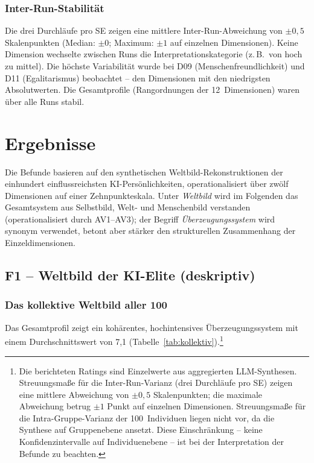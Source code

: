\documentclass[12pt,a4paper]{article}
\begin{document}
\subsubsection{Inter-Run-Stabilit\"at}

Die drei Durchl\"aufe pro SE zeigen eine mittlere Inter-Run-Abweichung von $\pm 0{,}5$ Skalenpunkten (Median: $\pm 0$; Maximum: $\pm 1$ auf einzelnen Dimensionen). Keine Dimension wechselte zwischen Runs die Interpretationskategorie (z.\,B.\ von \glqq hoch\grqq{} zu \glqq mittel\grqq). Die h\"ochste Variabilit\"at wurde bei D09 (Menschenfreundlichkeit) und D11 (Egalitarismus) beobachtet -- den Dimensionen mit den niedrigsten Absolutwerten. Die Gesamtprofile (Rang\-ordnungen der 12~Dimensionen) waren \"uber alle Runs stabil.


\section{Ergebnisse}
\label{sec:ergebnisse}

Die Befunde basieren auf den synthetischen Weltbild-Rekonstruktionen der einhundert einflussreichsten KI-Pers\"onlichkeiten, operationalisiert \"uber zw\"olf Dimensionen auf einer Zehnpunkteskala. Unter \emph{Weltbild} wird im Folgenden das Gesamtsystem aus Selbstbild, Welt- und Menschenbild verstanden (operationalisiert durch AV1--AV3); der Begriff \emph{\"Uberzeugungssystem} wird synonym verwendet, betont aber st\"arker den strukturellen Zusammenhang der Einzeldimensionen.


\subsection{F1 -- Weltbild der KI-Elite (deskriptiv)}
\label{sec:ergebnisse:f1}

\subsubsection{Das kollektive Weltbild aller 100}

Das Gesamtprofil zeigt ein koh\"arentes, hochintensives \"Uberzeugungssystem mit einem Durchschnittswert von 7,1 (Tabelle~\ref{tab:kollektiv}).\footnote{Die berichteten Ratings sind Einzelwerte aus aggregierten LLM-Synthesen. Streuungsma\ss{}e f\"ur die Inter-Run-Varianz (drei Durchl\"aufe pro SE) zeigen eine mittlere Abweichung von $\pm 0{,}5$ Skalenpunkten; die maximale Abweichung betrug $\pm 1$ Punkt auf einzelnen Dimensionen. Streuungsma\ss{}e f\"ur die Intra-Gruppe-Varianz der 100~Individuen liegen nicht vor, da die Synthese auf Gruppenebene ansetzt. Diese Einschr\"ankung -- keine Konfidenzintervalle auf Individuenebene -- ist bei der Interpretation der Befunde zu beachten.}
\end{document}

